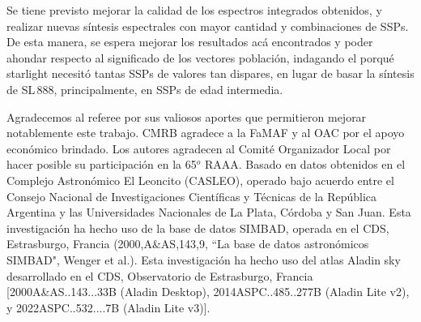 \documentclass[baaa]{baaa}
\begin{document}

Se tiene previsto mejorar la calidad de los espectros integrados obtenidos, y realizar nuevas síntesis espectrales con mayor cantidad y combinaciones de SSPs. De esta manera, se espera mejorar los resultados acá encontrados y poder ahondar respecto al significado de los vectores población, indagando el porqué {\sc starlight} necesitó tantas SSPs de valores tan dispares, en lugar de basar la síntesis de SL\,888, principalmente, en SSPs de edad intermedia.


\begin{acknowledgement}

{Agradecemos al referee por sus valiosos aportes que permitieron mejorar notablemente este trabajo. CMRB agradece a la FaMAF y al OAC por el apoyo económico brindado. Los autores agradecen al Comité Organizador Local por hacer posible su participación en la 65$^o$ RAAA.}
Basado en datos obtenidos en el Complejo Astronómico El Leoncito (CASLEO), operado bajo acuerdo entre el Consejo Nacional de Investigaciones Científicas y Técnicas de la República Argentina y las Universidades Nacionales de La Plata, Córdoba y San Juan. Esta investigación ha hecho uso de la base de datos SIMBAD, operada en el CDS, Estrasburgo, Francia (2000,A\&AS,143,9, ``La base de datos astronómicos SIMBAD", Wenger et al.). Esta investigación ha hecho uso del atlas Aladin sky desarrollado en el CDS, Observatorio de Estrasburgo, Francia [2000A\&AS..143...33B (Aladin Desktop), 2014ASPC..485..277B (Aladin Lite v2), y 2022ASPC..532....7B (Aladin Lite v3)]. 

\end{acknowledgement}



\small



 
\end{document}
